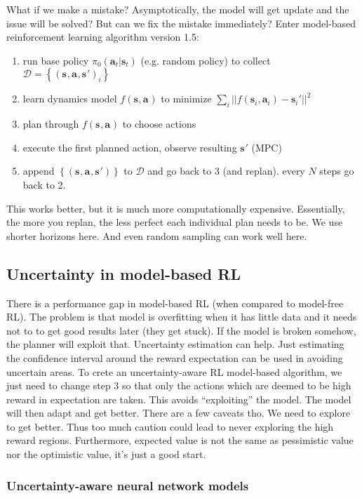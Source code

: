\documentclass{report}
\begin{document}
What if we make a mistake?
Asymptotically, the model will get update and the issue will be solved?
But can we fix the mistake immediately?
Enter model-based reinforcement learning algorithm version 1.5:
\begin{enumerate}
		\item run base policy $ \pi_0 (\bm{a}_t| \bm{s}_t)  $ (e.g. random policy) to collect $ \mathcal{D} = \left\{ \left( \bm{s}_{}, \bm{a}_{}, \bm{s}_{}' \right)_i  \right\}  $ 
		\item learn dynamics model $f(\bm{s}_{}, \bm{a}_{})$ to minimize $ \sum_{i}^{} || f (\bm{s}_{i}, \bm{a}_{i} ) - \bm{s}_{i}'||^2$ 
		\item plan through $f(\bm{s}_{}, \bm{a}_{})$ to choose actions
		\item execute the first planned action, observe resulting $ \bm{s}_{}' $ (MPC)
		\item append $\left\{ \left( \bm{s}_{}, \bm{a}_{}, \bm{s}_{}' \right)  \right\}  $ to $\mathcal{D}$ and go back to 3 (and replan). every $N$ steps go back to 2.
\end{enumerate}
This works better, but it is much more computationally expensive.
Essentially, the more you replan, the less perfect each individual plan needs to be.
We use shorter horizons here.
And even random sampling can work well here.

\subsection{Uncertainty in model-based RL}
There is a performance gap in model-based RL (when compared to model-free RL).
The problem is that model is overfitting when it has little data and it needs not to to get good results later (they get stuck).
If the model is broken somehow, the planner will exploit that.
Uncertainty estimation can help. Just estimating the confidence interval around the reward expectation can be
used in avoiding uncertain areas.
To crete an uncertainty-aware RL model-based algorithm, we just need to change step 3
so that only the actions which are deemed to be high reward in expectation are taken. This avoids ``exploiting'' the model.
The model will then adapt and get better.
There are a few caveats tho.
We need to explore to get better. Thus too much caution could lead to never exploring the high reward regions.
Furthermore, expected value is not the same as pessimistic value nor the optimistic value,
it's just a good start.

\subsubsection{Uncertainty-aware neural network models}
\end{document}
